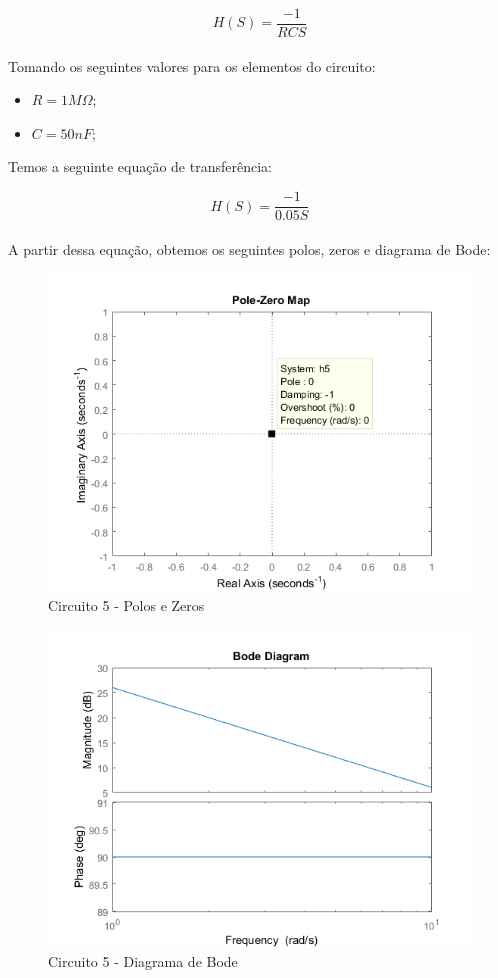 \documentclass[a4paper, 12pt]{article}
\begin{document}
			\[
			H(S) = \frac{-1}{RCS}
			\] 	\\

			Tomando os seguintes valores para os elementos do circuito:
			\begin{itemize}
				\item $R = 1M\Omega;$
				\item $C = 50nF;$
			\end{itemize}

			Temos a seguinte equação de transferência:

			\[
			H(S) = \frac{-1}{0.05S}
			\] 	\\

			A partir dessa equação, obtemos os seguintes polos, zeros e diagrama de Bode:

			\begin{figure}[!ht]
				\centering
				\includegraphics[scale=0.75]{img/1e_circ5.png}
				\caption{Circuito 5 - Polos e Zeros}
			\end{figure}
			\newpage
			\begin{figure}[!ht]
				\centering
				\includegraphics[scale=0.70]{img/1f_circ5.png}
				\caption{Circuito 5 - Diagrama de Bode}
			\end{figure}
\end{document}
